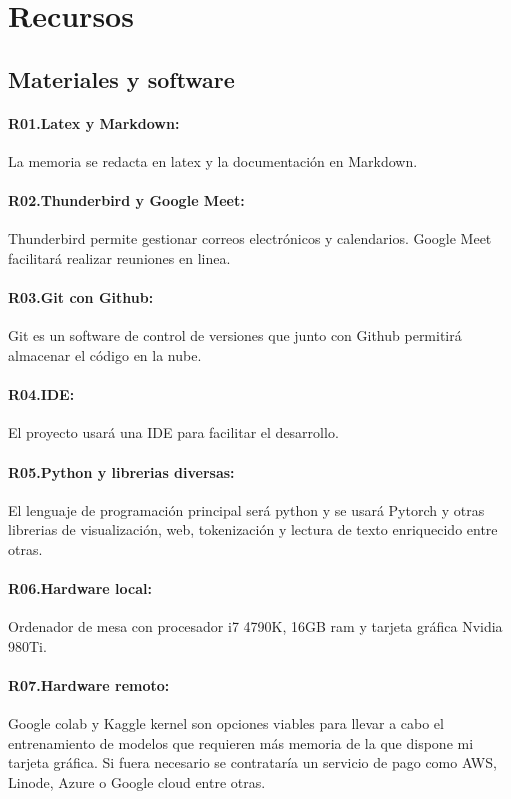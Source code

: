\section{Recursos}
\subsection{Materiales y software}
\paragraph{R01.\quad Latex y Markdown:}\label{R01} La memoria se redacta en latex y la documentación en Markdown.
\paragraph{R02.\quad Thunderbird y Google Meet:}\label{R02} Thunderbird permite gestionar
correos electrónicos y calendarios. Google Meet facilitará realizar reuniones en linea.
\paragraph{R03.\quad Git con Github:}\label{R03} Git es un software de control de versiones que junto con Github
permitirá almacenar el código en la nube.
\paragraph{R04.\quad IDE:}\label{R04} El proyecto usará una IDE para facilitar el desarrollo.
\paragraph{R05.\quad Python y librerias diversas:}\label{R05} El lenguaje de programación principal será python y 
se usará Pytorch y otras librerias de visualización, web, tokenización y lectura de texto enriquecido entre otras.
\paragraph{R06.\quad Hardware local:}\label{R06} Ordenador de mesa con procesador i7 4790K, 16GB ram y tarjeta gráfica
Nvidia 980Ti.
\paragraph{R07.\quad Hardware remoto:}\label{R07} Google colab y Kaggle kernel son opciones viables para llevar a cabo el entrenamiento
de modelos que requieren más memoria de la que dispone mi tarjeta gráfica.
Si fuera necesario se contrataría un servicio de pago como AWS, Linode, Azure o Google
cloud entre otras.

